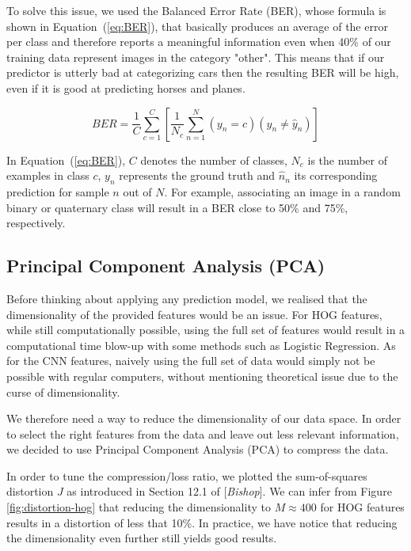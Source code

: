 \documentclass{article} %
\begin{document}
To solve this issue, we used the Balanced Error Rate (BER), whose formula is shown in Equation~(\ref{eq:BER}), that basically produces an average of the error per class and therefore reports a meaningful information even when 40\% of our training data represent images in the category "other". This means that if our predictor is utterly bad at categorizing cars then the resulting BER will be high, even if it is good at predicting horses and planes.

\begin{equation}
	\label{eq:BER}
    BER = \frac{1}{C}\sum_{c=1}^C \left[ \frac{1}{N_c} \sum_{n=1}^N \left(y_n = c\right) \left(y_n \neq \hat{y}_n \right) \right]
\end{equation}

In Equation~(\ref{eq:BER}), $C$ denotes the number of classes, $N_c$ is the number of examples in class $c$, $y_n$ represents the ground truth and $\hat{n}_n$ its corresponding prediction for sample $n$ out of $N$. For example, associating an image in a random binary or quaternary class will result in a BER close to 50\% and 75\%, respectively.

\subsection{Principal Component Analysis (PCA)}

Before thinking about applying any prediction model, we realised that the dimensionality of the provided features would be an issue. For HOG features, while still computationally possible, using the full set of features would result in a computational time blow-up with some methods such as Logistic Regression. As for the CNN features, naively using the full set of data would simply not be possible with regular computers, without mentioning theoretical issue due to the curse of dimensionality.

We therefore need a way to reduce the dimensionality of our data space. In order to select the right features from the data and leave out less relevant information, we decided to use Principal Component Analysis (PCA) to compress the data.

In order to tune the compression/loss ratio, we plotted the sum-of-squares distortion $J$ as introduced in Section 12.1 of [\textit{Bishop}].
We can infer from Figure \ref{fig:distortion-hog} that reducing the dimensionality to $M \approx 400$ for HOG features results in a distortion of less that 10\%. In practice, we have notice that reducing the dimensionality even further still yields good results.
\end{document}
